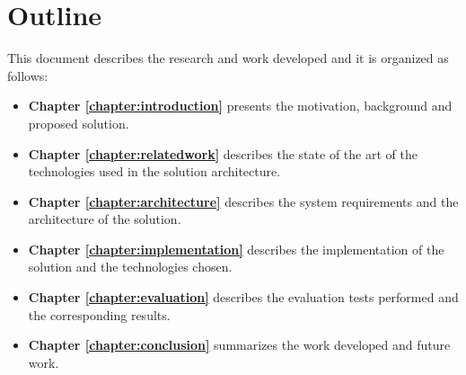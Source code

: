 \section{Outline}
This document describes the research and work developed and it is organized as follows:

\begin{itemize}
\item \textbf{Chapter \ref{chapter:introduction}} presents the motivation, background and proposed solution.
\item \textbf{Chapter \ref{chapter:relatedwork}} describes the state of the art of the technologies used in the solution architecture.
\item \textbf{Chapter \ref{chapter:architecture}} describes the system requirements and the architecture of the solution.
\item \textbf{Chapter \ref{chapter:implementation}} describes the implementation of the solution and the technologies chosen.
\item \textbf{Chapter \ref{chapter:evaluation}} describes the evaluation tests performed and the corresponding results.
\item \textbf{Chapter \ref{chapter:conclusion}} summarizes the work developed and future work.
\end{itemize}

\cleardoublepage

